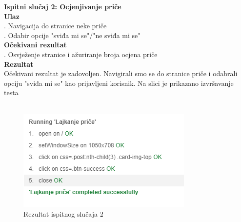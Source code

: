 {			 \noindent \textbf{Ispitni slučaj 2: Ocjenjivanje priče}
			 \\
			 \textbf{Ulaz}
			 \\
			 . Navigacija do stranice neke priče \\
			 . Odabir opcije "sviđa mi se"/"ne sviđa mi se" \\
			 \textbf{Očekivani rezultat}
			 \\
			 . Osvježenje stranice i ažuriranje broja ocjena priče\\
			 \textbf{Rezultat}
			 \\
			 \indent Očekivani rezultat je zadovoljen. Navigirali smo se do stranice priče i odabrali opciju "sviđa mi se" kao prijavljeni korisnik. Na slici je prikazano izvršavanje testa
			 \\ \\
			 \begin{figure}[H]
			 	\centering
			 	\includegraphics[scale=0.7]{"slike/test8"}
			 	\caption{Rezultat ispitnog slučaja 2}
			 	\label{fig:rezultat-ispitnog-slucaja-8}
			 \end{figure}
			 
}
